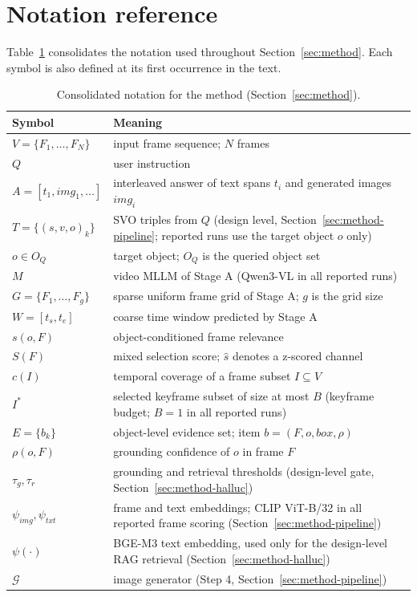 
\section{Notation reference}\label{app:notation}

Table~\ref{tab:notation} consolidates the notation used throughout Section~\ref{sec:method}. Each symbol is also defined at its first occurrence in the text.

\begin{table}[htbp]
\centering
\begin{tabular}{@{}lp{8.6cm}@{}}
\toprule
Symbol & Meaning \\
\midrule
$V = \{F_1,\ldots,F_N\}$ & input frame sequence; $N$ frames \\
$Q$ & user instruction \\
$A = [t_1, img_1, \ldots]$ & interleaved answer of text spans $t_i$ and generated images $img_i$ \\
$T = \{(s,v,o)_k\}$ & SVO triples from $Q$ (design level, Section~\ref{sec:method-pipeline}; reported runs use the target object $o$ only) \\
$o \in O_Q$ & target object; $O_Q$ is the queried object set \\
$M$ & video MLLM of Stage A (Qwen3-VL in all reported runs) \\
$G = \{F_1,\ldots,F_g\}$ & sparse uniform frame grid of Stage A; $g$ is the grid size \\
$W = [t_s, t_e]$ & coarse time window predicted by Stage A \\
$s(o,F)$ & object-conditioned frame relevance \\
$S(F)$ & mixed selection score; $\hat{s}$ denotes a z-scored channel \\
$c(I)$ & temporal coverage of a frame subset $I \subseteq V$ \\
$I^*$ & selected keyframe subset of size at most $B$ (keyframe budget; $B=1$ in all reported runs) \\
$E = \{b_k\}$ & object-level evidence set; item $b = (F,o,box,\rho)$ \\
$\rho(o,F)$ & grounding confidence of $o$ in frame $F$ \\
$\tau_g, \tau_r$ & grounding and retrieval thresholds (design-level gate, Section~\ref{sec:method-halluc}) \\
$\psi_{img}, \psi_{txt}$ & frame and text embeddings; CLIP ViT-B/32 in all reported frame scoring (Section~\ref{sec:method-pipeline}) \\
$\psi(\cdot)$ & BGE-M3 text embedding, used only for the design-level RAG retrieval (Section~\ref{sec:method-halluc}) \\
$\mathcal{G}$ & image generator (Step 4, Section~\ref{sec:method-pipeline}) \\
\bottomrule
\end{tabular}
\caption{Consolidated notation for the method (Section~\ref{sec:method}).}
\label{tab:notation}
\end{table}

